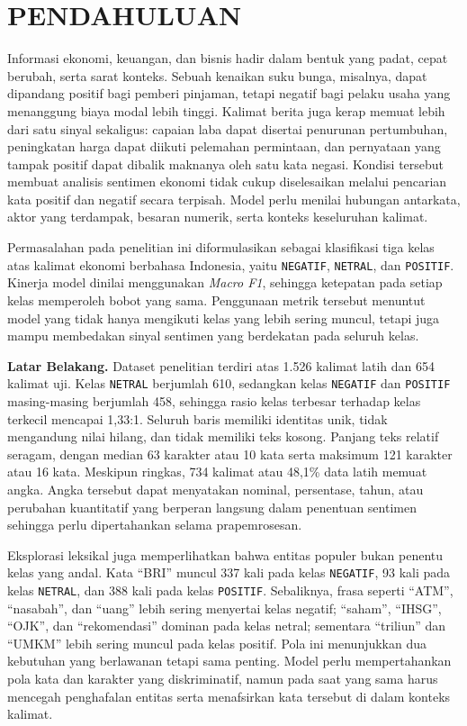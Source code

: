\section{PENDAHULUAN}

Informasi ekonomi, keuangan, dan bisnis hadir dalam bentuk yang padat, cepat berubah, serta sarat konteks. Sebuah kenaikan suku bunga, misalnya, dapat dipandang positif bagi pemberi pinjaman, tetapi negatif bagi pelaku usaha yang menanggung biaya modal lebih tinggi. Kalimat berita juga kerap memuat lebih dari satu sinyal sekaligus: capaian laba dapat disertai penurunan pertumbuhan, peningkatan harga dapat diikuti pelemahan permintaan, dan pernyataan yang tampak positif dapat dibalik maknanya oleh satu kata negasi. Kondisi tersebut membuat analisis sentimen ekonomi tidak cukup diselesaikan melalui pencarian kata positif dan negatif secara terpisah. Model perlu menilai hubungan antarkata, aktor yang terdampak, besaran numerik, serta konteks keseluruhan kalimat.

Permasalahan pada penelitian ini diformulasikan sebagai klasifikasi tiga kelas atas kalimat ekonomi berbahasa Indonesia, yaitu \texttt{NEGATIF}, \texttt{NETRAL}, dan \texttt{POSITIF}. Kinerja model dinilai menggunakan \textit{Macro F1}, sehingga ketepatan pada setiap kelas memperoleh bobot yang sama. Penggunaan metrik tersebut menuntut model yang tidak hanya mengikuti kelas yang lebih sering muncul, tetapi juga mampu membedakan sinyal sentimen yang berdekatan pada seluruh kelas.

\textbf{Latar Belakang.} Dataset penelitian terdiri atas 1.526 kalimat latih dan 654 kalimat uji. Kelas \texttt{NETRAL} berjumlah 610, sedangkan kelas \texttt{NEGATIF} dan \texttt{POSITIF} masing-masing berjumlah 458, sehingga rasio kelas terbesar terhadap kelas terkecil mencapai 1,33:1. Seluruh baris memiliki identitas unik, tidak mengandung nilai hilang, dan tidak memiliki teks kosong. Panjang teks relatif seragam, dengan median 63 karakter atau 10 kata serta maksimum 121 karakter atau 16 kata. Meskipun ringkas, 734 kalimat atau 48,1\% data latih memuat angka. Angka tersebut dapat menyatakan nominal, persentase, tahun, atau perubahan kuantitatif yang berperan langsung dalam penentuan sentimen sehingga perlu dipertahankan selama prapemrosesan.

Eksplorasi leksikal juga memperlihatkan bahwa entitas populer bukan penentu kelas yang andal. Kata ``BRI'' muncul 337 kali pada kelas \texttt{NEGATIF}, 93 kali pada kelas \texttt{NETRAL}, dan 388 kali pada kelas \texttt{POSITIF}. Sebaliknya, frasa seperti ``ATM'', ``nasabah'', dan ``uang'' lebih sering menyertai kelas negatif; ``saham'', ``IHSG'', ``OJK'', dan ``rekomendasi'' dominan pada kelas netral; sementara ``triliun'' dan ``UMKM'' lebih sering muncul pada kelas positif. Pola ini menunjukkan dua kebutuhan yang berlawanan tetapi sama penting. Model perlu mempertahankan pola kata dan karakter yang diskriminatif, namun pada saat yang sama harus mencegah penghafalan entitas serta menafsirkan kata tersebut di dalam konteks kalimat.

